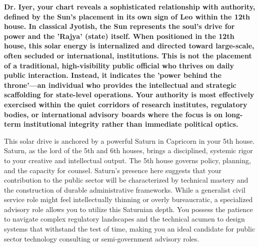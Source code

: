 
\label{topic47}

{\fontsize{9.5}{13.8}\selectfont\bfseries\color{DeepSlate} Dr. Iyer, your chart reveals a sophisticated relationship with authority, defined by the Sun's placement in its own sign of Leo within the 12th house. In classical Jyotish, the Sun represents the soul's drive for power and the 'Rajya' (state) itself. When positioned in the 12th house, this solar energy is internalized and directed toward large-scale, often secluded or international, institutions. This is not the placement of a traditional, high-visibility public official who thrives on daily public interaction. Instead, it indicates the 'power behind the throne'---an individual who provides the intellectual and strategic scaffolding for state-level operations. Your authority is most effectively exercised within the quiet corridors of research institutes, regulatory bodies, or international advisory boards where the focus is on long-term institutional integrity rather than immediate political optics.}\par\vspace{2mm}

{\fontsize{9}{13}\selectfont This solar drive is anchored by a powerful Saturn in Capricorn in your 5th house. Saturn, as the lord of the 5th and 6th houses, brings a disciplined, systemic rigor to your creative and intellectual output. The 5th house governs policy, planning, and the capacity for counsel. Saturn's presence here suggests that your contribution to the public sector will be characterized by technical mastery and the construction of durable administrative frameworks. While a generalist civil service role might feel intellectually thinning or overly bureaucratic, a specialized advisory role allows you to utilize this Saturnian depth. You possess the patience to navigate complex regulatory landscapes and the technical acumen to design systems that withstand the test of time, making you an ideal candidate for public sector technology consulting or semi-government advisory roles.}\par\vspace{1.8mm}

